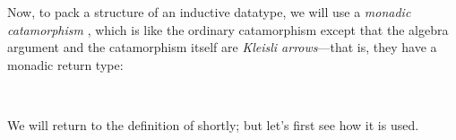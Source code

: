 \documentclass[fleqn,runningheads]{llncs}
\begin{document}
Now, to pack a structure of an inductive datatype, we will use a \emph{monadic catamorphism} \cite{Meijer&Jeuring95:Merging}, which is like the ordinary catamorphism except that the algebra argument and the catamorphism itself are \emph{Kleisli arrows}---that is, they have a monadic return type:
\begin{AgdaAlign}
\begin{code}%
\>[0]\<%
\\
\>[0][@{}l@{\AgdaIndent{0}}]%
\>[2]\AgdaSpace{}%
\AgdaSymbol{:}%
\>[11]\AgdaSymbol{(}\AgdaSpace{}%
\AgdaSymbol{:}\AgdaSpace{}%
\AgdaSymbol{)}\AgdaSpace{}%
\AgdaSpace{}%
\AgdaSymbol{(}\AgdaOperator{\AgdaFunction{[[}}\AgdaSpace{}%
\AgdaSpace{}%
\AgdaOperator{\AgdaFunction{]]B}}\AgdaSpace{}%
\AgdaSpace{}%
\AgdaSpace{}%
\AgdaSpace{}%
\AgdaSpace{}%
\AgdaSymbol{)}\AgdaSpace{}%
\AgdaSpace{}%
\AgdaOperator{\AgdaFunction{[[}}\AgdaSpace{}%
\AgdaSpace{}%
\AgdaSpace{}%
\AgdaOperator{\AgdaFunction{]]F}}\AgdaSpace{}%
\AgdaSpace{}%
\AgdaSpace{}%
\AgdaSpace{}%
\<%
\end{code}
We will return to the definition of  shortly; but let's first see how it is used.


\end{AgdaAlign}
\end{document}
